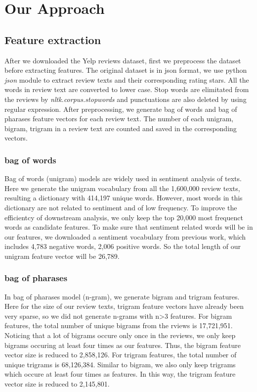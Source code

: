 \section{Our Approach}
\label{sec:method}

\subsection{Feature extraction}
After we downloaded the Yelp reviews dataset, first we preprocess the dataset before extracting features. The original dataset is in json format, we use python \textit{json} module to extract review texts and their corresponding rating stars. All the words in review text are converted to lower case. Stop words are elimitated from the reviews by \textit{nltk.corpus.stopwords} and punctuations are also deleted by using regular expression. After preprocessing, we generate bag of words and bag of pharases feature vectors for each review text. The number of each unigram, bigram, trigram in a review text are counted and saved in the corresponding vectors.

\subsubsection{bag of words}
Bag of words (unigram) models are widely used in sentiment analysis of texts. Here we generate the unigram vocabulary from all the 1,600,000 review texts, resulting a dictionary with 414,197 unique words. However, most words in this dictionary are not related to sentiment and of low frequency. To improve the efficientcy of downstream analysis, we only keep the top 20,000 most frequenct words as candidate features. To make sure that sentiment related words will be in our features, we downloaded a sentiment vocabulary from previous work\cite{hu2004mining}, which includes 4,783 negative words, 2,006 positive words. So the total length of our unigram feature vector will be 26,789.

\subsubsection{bag of pharases}
In bag of pharases model (n-gram), we generate bigram and trigram features. Here for the size of our review texts, trigram feature vectors have already been very sparse, so we did not generate n-grams with n>3 features. For bigram features, the total number of unique bigrams from the rviews is 17,721,951. Noticing that a lot of bigrams occure only once in the reviews, we only keep bigrams occuring at least four times as our features. Thus, the bigram feature vector size is reduced to 2,858,126. For trigram features, the total number of unique trigrams is 68,126,384. Similar to bigram, we also only keep trigrams which occure at least four times as features. In this way, the trigram feature vector size is reduced to 2,145,801.

